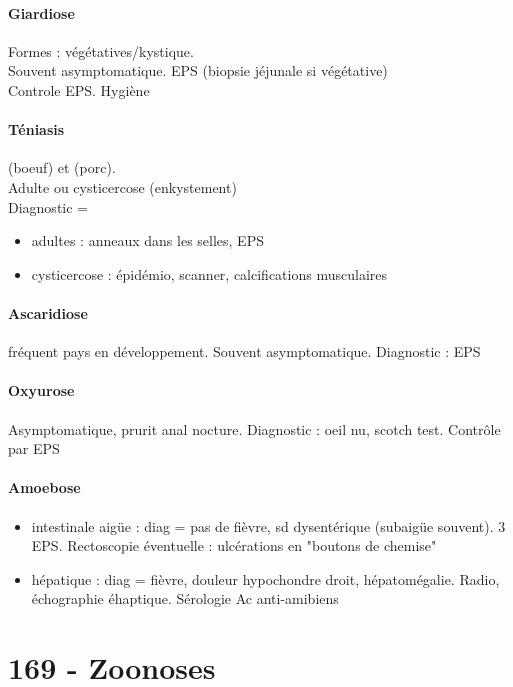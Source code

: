 \paragraph{Giardiose} Formes : végétatives/kystique. \\
Souvent asymptomatique. EPS (biopsie jéjunale si végétative)\\
Controle EPS. Hygiène

\paragraph{Téniasis}  (boeuf) et  (porc).\\
  Adulte ou cysticercose (enkystement)\\
  Diagnostic = 
  \begin{itemize}
    \item adultes : anneaux dans les selles, EPS
    \item cysticercose : épidémio, scanner, calcifications musculaires
  \end{itemize}

\paragraph{Ascaridiose} fréquent pays en développement. Souvent asymptomatique.
Diagnostic : EPS

\paragraph{Oxyurose} Asymptomatique, prurit anal nocture. Diagnostic : oeil nu,
scotch test. Contrôle par EPS

\paragraph{Amoebose} 
\begin{itemize}
  \item intestinale aigüe : diag = pas de fièvre, sd dysentérique (subaigüe
    souvent). 3 EPS. Rectoscopie éventuelle : ulcérations en "boutons de chemise"
  \item hépatique : diag = fièvre, douleur hypochondre droit, hépatomégalie.
    Radio, échographie éhaptique. Sérologie Ac anti-amibiens
\end{itemize}

\section{169 - Zoonoses}%
\label{sec:ue_6_169_zoonoses}

